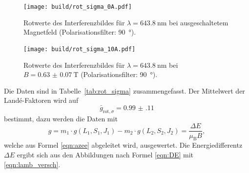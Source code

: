 \begin{figure}[htb]
  \centering
  \texttt{[image: build/rot\_sigma\_0A.pdf]}
  \caption{Rotwerte des Interferenzbildes für $\lambda=\SI{643.8}{\nano\meter}$ bei ausgeschaltetem Magnetfeld (Polarisationsfilter: \SI{90}{\degree}).}
  \label{fig:rot_sigma_0A_plot}
\end{figure}
\begin{figure}[htb]
  \centering
  \texttt{[image: build/rot\_sigma\_10A.pdf]}
  \caption{Rotwerte des Interferenzbildes für $\lambda=\SI{643.8}{\nano\meter}$ bei $B=\SI{0.63(7)}{\tesla}$ (Polarisationsfilter: \SI{90}{\degree}).}
  \label{fig:rot_sigma_10A_plot}
\end{figure}
Die Daten sind in Tabelle~\ref{tab:rot_sigma} zusammengefasst.
Der Mittelwert der Landé-Faktoren wird auf
\begin{equation}
  \label{eqn:g_rot_sigma}
  \bar{g}_{\text{rot},\sigma}=\num{0.99(11)}
\end{equation}
bestimmt, dazu werden die Daten mit  
\begin{equation}
  \label{eqn:g}
  g=m_1 \cdot g(L_1, S_1, J_1) - m_2 \cdot g(L_2, S_2, J_2)=\frac{\Delta E}{\mu_\text{B}B},
\end{equation}
welche aus Formel \eqref{eqn:azee} abgeleitet wird, ausgewertet. Die Energiedifferentz $\Delta E$ ergibt sich aus den 
Abbildungen nach Formel \eqref{eqn:DE} mit \eqref{eqn:lamb_versch}.

\FloatBarrier

